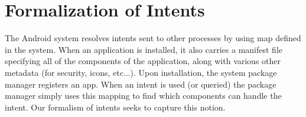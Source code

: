 \documentclass{acm_proc_article-sp}
\begin{document}

\section{Formalization of Intents}

The Android system resolves intents sent to other processes by using
map defined in the system.  When an application is installed, it also
carries a manifest file specifying all of the components of the
application, along with various other metadata (for security, icons,
etc...).  Upon installation, the system package manager registers an
app.  When an intent is used (or queried) the package manager simply
uses this mapping to find which components can handle the intent.  Our
formalism of intents seeks to capture this notion.
\end{document}
